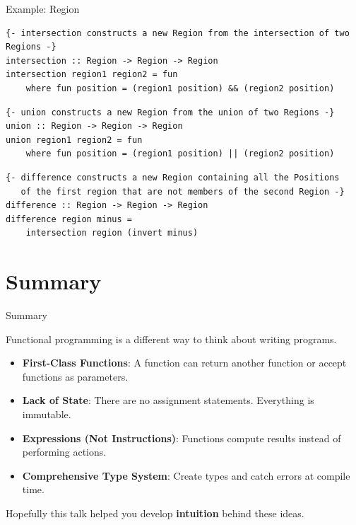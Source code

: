 \documentclass[8pt,aspectratio=169]{beamer}
\begin{document}

\begin{frame}[fragile]{Example: Region}

\begin{verbatim}
{- intersection constructs a new Region from the intersection of two Regions -}
intersection :: Region -> Region -> Region
intersection region1 region2 = fun
    where fun position = (region1 position) && (region2 position)
\end{verbatim}

\pause
\begin{verbatim}
{- union constructs a new Region from the union of two Regions -}
union :: Region -> Region -> Region
union region1 region2 = fun
    where fun position = (region1 position) || (region2 position)
\end{verbatim}

\pause
\begin{verbatim}
{- difference constructs a new Region containing all the Positions
   of the first region that are not members of the second Region -}
difference :: Region -> Region -> Region
difference region minus = 
    intersection region (invert minus)
\end{verbatim}

\end{frame}


\section{Summary}


\begin{frame}{Summary}

Functional programming is a different way to think about writing programs.
\newline

\begin{itemize}
\item
  \textbf{First-Class Functions}: A function can return another function or accept functions as parameters.
\item
  \textbf{Lack of State}: There are no assignment statements. Everything is immutable.
\item
  \textbf{Expressions (Not Instructions)}: Functions compute results instead of performing actions.
\item
  \textbf{Comprehensive Type System}: Create types and catch errors at compile time.
\end{itemize}

\vspace{5mm}

Hopefully this talk helped you develop \textbf{intuition} behind these ideas.

\end{frame}
\end{document}
